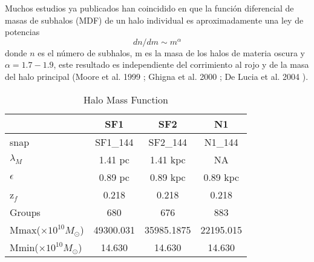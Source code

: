 \documentclass[a4paper,openright,12pt]{book}
\begin{document}
Muchos estudios ya publicados han coincidido en que la función diferencial de masas de subhalos (MDF) de un halo individual es aproximadamente una ley de potencias
\begin{equation}
dn/dm \sim m^{\alpha}\label{eqn 4.11}
\end{equation}
donde $n$ es el número de subhalos, m es la masa de los halos de materia oscura y $\alpha = 1.7 - 1.9$, este resultado es independiente del corrimiento al rojo y de la masa del halo principal (Moore et al. 1999 \cite{4.4.6}; Ghigna et al. 2000 \cite{4.4.7}; De Lucia et al. 2004 \cite{4.4.8}). 
\begin{table}
\caption{Halo Mass Function}
\label{Tabla 4.4}\centering%
\begin{tabular}{lccc}
\toprule%
&SF1&SF2&N1 \\\toprule%
\textsf{snap}&SF1\_{144}&SF2\_{144}&N1\_{144} \\
$\lambda_{M}$&1.41 pc&1.41 kpc&NA\\
$\epsilon$&0.89 pc&0.89 kpc& 0.89 kpc\\
\textsf{z$_{f}$}&0.218&0.218&0.218\\
\textsf{Groups}&680&676&883\\
\textsf{Mmax}($\times10^{10}M_\odot$)&49300.031&35985.1875&22195.015\\
\textsf{Mmin}($\times10^{10}M_\odot$)&14.630&14.630&14.630\\\bottomrule
\end{tabular}
\end{table} 
\end{document}
